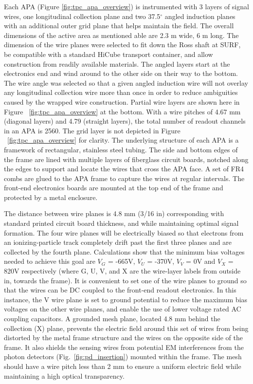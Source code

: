 Each APA (Figure \ref{fig:tpc_apa_overview}) is instrumented with 3 layers of signal wires, one longitudinal collection plane and two 37.5$^\circ$ angled induction planes with an additional outer grid plane that helps maintain the field. The overall dimensions of the active area as mentioned able are 2.3 m wide, 6 m long. The dimension of the wire planes were selected to fit down the Ross shaft at SURF, be compatible with a standard HiCube transport container, and allow construction from readily available materials.  The angled layers start at the electronics end and wind around to the other side on their way to the bottom. The wire angle was selected so that a given angled induction wire will not overlay any longitudinal collection wire more than once in order to reduce ambiguities caused by the wrapped wire construction. Partial wire layers are shown here in Figure ~\ref{fig:tpc_apa_overview} at the bottom.  With a wire pitches of 4.67 mm (diagonal layers) and 4.79 (straight layers), the total number of readout channels in an APA is 2560.
The grid layer is not depicted in Figure ~\ref{fig:tpc_apa_overview} for clarity. The underlying structure of each APA is a framework of rectangular, stainless steel tubing.  The side and bottom edges of the frame are lined with multiple layers of fiberglass circuit boards, notched along the edges to support and locate the wires that cross the APA face. A set of FR4 combs are glued to the APA frame to capture the wires at regular intervals. The front-end electronics boards are mounted at the top end of the frame and protected by a metal enclosure. 


The distance between wire planes is 4.8 mm (3/16 in) corresponding with standard printed circuit board thickness, and while maintaining optimal signal formation. The four wire planes will be electrically biased so that electrons from an ionizing-particle track completely drift past the first three planes and are collected by the fourth plane. Calculations show that the minimum bias voltages needed to achieve this goal are $V_G$ = -665V, $V_U$ = -370V, $V_V$ = 0V and $V_X$ = 820V respectively (where G, U, V, and X are the wire-layer labels from outside in, towards the frame).  It is convenient to set one of the wire planes to ground so that the wires can be DC coupled to the front-end readout electronics. In this instance, the V wire plane is set to ground potential to reduce the maximum bias voltages on the other wire planes, and enable the use of lower voltage rated AC coupling capacitors. A grounded mesh plane, located 4.8 mm behind the collection (X) plane, prevents the electric field around this set of wires from being distorted by the metal frame structure and the wires on the opposite side of the frame. It also shields the sensing wires from potential EM interferences from the photon detectors (Fig.~\ref{fig:pd_insertion}) mounted within the frame. The mesh should have a wire pitch less than 2 mm to ensure a uniform electric field while maintaining a high optical transparency.


